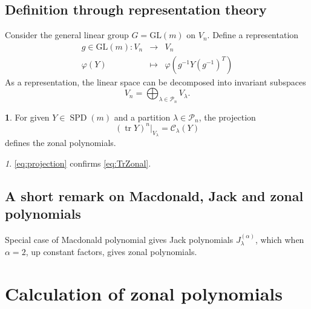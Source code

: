 \documentclass[10pt,oneside,american]{amsart}
\numberwithin{equation}{section}
\numberwithin{figure}{section}
\theoremstyle{plain}
\theoremstyle{definition}
\newtheorem{defn}[thm]{\protect\definitionname}
\theoremstyle{remark}
\newtheorem{rem}[thm]{\protect\remarkname}
\theoremstyle{plain}
\theoremstyle{definition}
\theoremstyle{plain}
\theoremstyle{plain}
\DeclareMathOperator{\Tr}{tr}
\newcommand{\SPD}{\operatorname{SPD}}
\providecommand{\definitionname}{Definition}
\providecommand{\remarkname}{Remark}
\begin{document}
\subsection{Definition through representation theory}

Consider the general linear group $G=\mathrm{GL}(m)$ on
$V_{n}$. Define a representation 
\begin{eqnarray*}
g\in\mathrm{GL}(m):V_{n} & \rightarrow & V_{n}\\
\varphi\left(Y\right) & \mapsto & \varphi\left(g^{-1}Y\left(g^{-1}\right)^{T}\right)
\end{eqnarray*}
As a representation, the linear space can be decomposed into invariant
subspaces \cite[p.~611]{Representation}
\[
V_{n}=\bigoplus_{\lambda\in\mathcal{P}_{n}}V_{\lambda}.
\]

\begin{defn}
For given $Y\in \SPD(m)$ and a partition $\lambda\in\mathcal{P}_{n}$,
the projection
\begin{equation}
\left(\Tr Y\right)^{n}\bigg|_{V_{\lambda}}=\mathcal{C}_{\lambda}(Y)\label{eq:projection}
\end{equation}
defines the zonal polynomials.
\end{defn}
\begin{rem}
\eqref{eq:projection} confirms \eqref{eq:TrZonal}. 
\end{rem}

\subsection{A short remark on Macdonald, Jack and zonal polynomials}

Special case of Macdonald polynomial gives Jack polynomials $J_{\lambda}^{\left(\alpha\right)}$,
which when $\alpha=2$, up constant factors, gives zonal polynomials. 


\section{Calculation of zonal polynomials}
\end{document}

